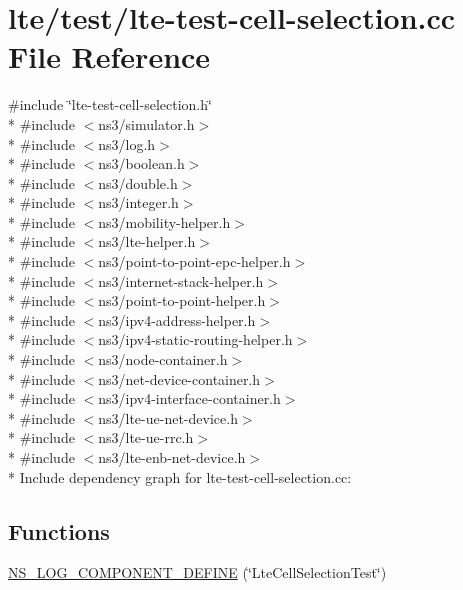 \hypertarget{lte-test-cell-selection_8cc}{}\section{lte/test/lte-\/test-\/cell-\/selection.cc File Reference}
\label{lte-test-cell-selection_8cc}
{\ttfamily \#include \char`\"{}lte-\/test-\/cell-\/selection.\+h\char`\"{}}\\*
{\ttfamily \#include $<$ns3/simulator.\+h$>$}\\*
{\ttfamily \#include $<$ns3/log.\+h$>$}\\*
{\ttfamily \#include $<$ns3/boolean.\+h$>$}\\*
{\ttfamily \#include $<$ns3/double.\+h$>$}\\*
{\ttfamily \#include $<$ns3/integer.\+h$>$}\\*
{\ttfamily \#include $<$ns3/mobility-\/helper.\+h$>$}\\*
{\ttfamily \#include $<$ns3/lte-\/helper.\+h$>$}\\*
{\ttfamily \#include $<$ns3/point-\/to-\/point-\/epc-\/helper.\+h$>$}\\*
{\ttfamily \#include $<$ns3/internet-\/stack-\/helper.\+h$>$}\\*
{\ttfamily \#include $<$ns3/point-\/to-\/point-\/helper.\+h$>$}\\*
{\ttfamily \#include $<$ns3/ipv4-\/address-\/helper.\+h$>$}\\*
{\ttfamily \#include $<$ns3/ipv4-\/static-\/routing-\/helper.\+h$>$}\\*
{\ttfamily \#include $<$ns3/node-\/container.\+h$>$}\\*
{\ttfamily \#include $<$ns3/net-\/device-\/container.\+h$>$}\\*
{\ttfamily \#include $<$ns3/ipv4-\/interface-\/container.\+h$>$}\\*
{\ttfamily \#include $<$ns3/lte-\/ue-\/net-\/device.\+h$>$}\\*
{\ttfamily \#include $<$ns3/lte-\/ue-\/rrc.\+h$>$}\\*
{\ttfamily \#include $<$ns3/lte-\/enb-\/net-\/device.\+h$>$}\\*
Include dependency graph for lte-\/test-\/cell-\/selection.cc\+:
\subsection*{Functions}
\begin{DoxyCompactItemize}
\item 
\hyperlink{lte-test-cell-selection_8cc_a8c775ae9db4ca2d32168c1003e31cc86}{N\+S\+\_\+\+L\+O\+G\+\_\+\+C\+O\+M\+P\+O\+N\+E\+N\+T\+\_\+\+D\+E\+F\+I\+NE} (\char`\"{}Lte\+Cell\+Selection\+Test\char`\"{})
\end{DoxyCompactItemize}
